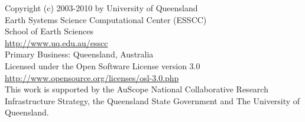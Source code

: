 
%
%
%


\begin{center}
Copyright (c) 2003-2010 by University of Queensland	\\
Earth Systems Science Computational Center (ESSCC)	\\
School of Earth Sciences \\
\url{http://www.uq.edu.au/esscc}			\\
Primary Business: Queensland, Australia			\\
Licensed under the Open Software License version 3.0	\\
\url{http://www.opensource.org/licenses/osl-3.0.php}	\\

This work is supported by the AuScope National Collaborative Research Infrastructure Strategy, 
the Queensland State Government and The University of Queensland.

\end{center}

